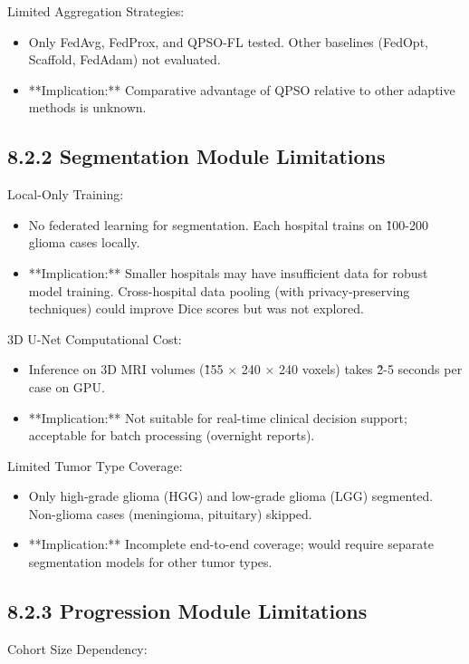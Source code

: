 Limited Aggregation Strategies:

\begin{itemize}
  \item Only FedAvg, FedProx, and QPSO-FL tested. Other baselines (FedOpt, Scaffold, FedAdam) not evaluated.
  \item **Implication:** Comparative advantage of QPSO relative to other adaptive methods is unknown.
\end{itemize}


\subsection{8.2.2 Segmentation Module Limitations}
Local-Only Training:

\begin{itemize}
  \item No federated learning for segmentation. Each hospital trains on \~100-200 glioma cases locally.
  \item **Implication:** Smaller hospitals may have insufficient data for robust model training. Cross-hospital data pooling (with privacy-preserving techniques) could improve Dice scores but was not explored.
\end{itemize}

3D U-Net Computational Cost:

\begin{itemize}
  \item Inference on 3D MRI volumes (\~155 × 240 × 240 voxels) takes \~2-5 seconds per case on GPU.
  \item **Implication:** Not suitable for real-time clinical decision support; acceptable for batch processing (overnight reports).
\end{itemize}

Limited Tumor Type Coverage:

\begin{itemize}
  \item Only high-grade glioma (HGG) and low-grade glioma (LGG) segmented. Non-glioma cases (meningioma, pituitary) skipped.
  \item **Implication:** Incomplete end-to-end coverage; would require separate segmentation models for other tumor types.
\end{itemize}


\subsection{8.2.3 Progression Module Limitations}
Cohort Size Dependency:

